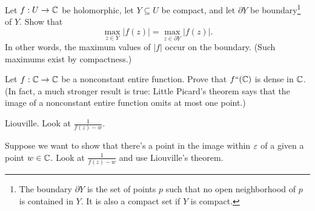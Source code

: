 
\begin{dproblem}
	Let $f : U \to \mathbb C$ be holomorphic, let $Y \subseteq U$ be compact,
	and let $\partial Y$ be boundary\footnote{
		The boundary $\partial Y$ is the set of points $p$
		such that no open neighborhood of $p$ is contained in $Y$.
		It is also a compact set if $Y$ is compact.
	} of $Y$.
	Show that
	\[ \max_{z \in Y} \left\lvert f(z) \right\rvert
		= \max_{z \in \partial Y} \left\lvert f(z) \right\rvert. \]
	In other words, the maximum values of $\left\lvert f \right\rvert$ occur
	on the boundary. (Such maximums exist by compactness.)
\end{dproblem}

\begin{problem}
	Let $f : \mathbb C \to \mathbb C$ be a nonconstant entire function.
	Prove that $f``(\mathbb C)$ is dense in $\mathbb C$.
	(In fact, a much stronger result is true:
	Little Picard's theorem says that the image of a nonconstant
	entire function omits at most one point.)
	\begin{hint}
		Liouville. Look at $\frac{1}{f(z)-w}$.
	\end{hint}
	\begin{sol}
		Suppose we want to show that there's a point
		in the image within $\varepsilon$ of a given a point $w \in \mathbb C$.
		Look at $\frac{1}{f(z) - w}$ and use Liouville's theorem.
	\end{sol}
\end{problem}

%

